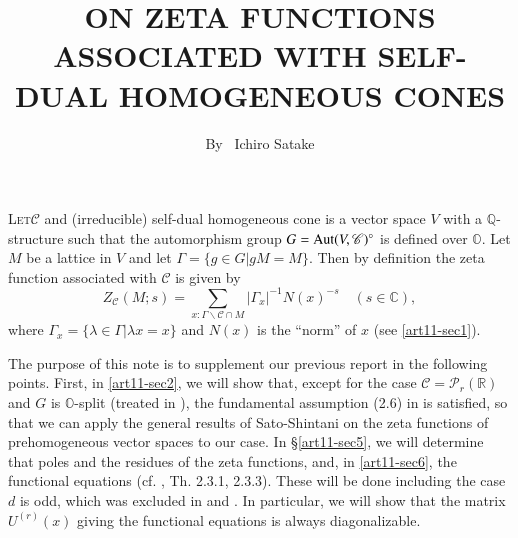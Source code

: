 \title{ON ZETA FUNCTIONS ASSOCIATED WITH SELF-DUAL HOMOGENEOUS CONES}

\author{By~ Ichiro Satake}

\date{}
\maketitle

\setcounter{pageoriginal}{176}
\textsc{Let}\pageoriginale $\mathscr{C}$  and (irreducible) self-dual homogeneous cone is a vector space $V$ with a $\mathbb{Q}$-structure such that the automorphism group $G=\operatorname{Aut}(V,\mathscr{C})^{\circ}$ is defined over $\mathbb{O}$. Let $M$ be a lattice in $V$ and let $\Gamma=\{g\in G|gM=M\}$. Then by definition the zeta function associated with $\mathscr{C}$ is given by
\begin{equation}
Z_{\mathscr{C}}(M;s)=\sum\limits_{x:\Gamma\backslash\mathscr{C}\cap M}|\Gamma_{x}|^{-1}N(x)^{-s}\quad (s\in\mathbb{C}),\label{art11-eq1}
\end{equation}
where $\Gamma_{x}=\{\lambda\in\Gamma|\lambda x=x\}$ and $N(x)$ is the ``norm'' of $x$ (see \ref{art11-sec1}).

The purpose of this note is to supplement our previous report \cite{art11-keySO} in the following points. First, in \ref{art11-sec2}, we will show that, except for the case $\mathscr{C}=\mathscr{P}_{r}(\mathbb{R})$ and $G$ is $\mathbb{O}$-split (treated in \cite{art11-keySh}), the fundamental assumption (2.6) in \cite{art11-keySS} is satisfied, so that we can apply the general results of Sato-Shintani on the zeta functions of prehomogeneous vector spaces to our case. In \S\ref{art11-sec5}, we will determine that poles and the residues of the zeta functions, and, in \ref{art11-sec6}, the functional equations (cf. \cite{art11-keySO}, Th. 2.3.1, 2.3.3). These will be done including the case $d$ is odd, which was excluded in \cite{art11-keySF} and \cite{art11-keySO}. In particular, we will show that the matrix $U^{(r)}(x)$ giving the functional equations is always diagonalizable.

